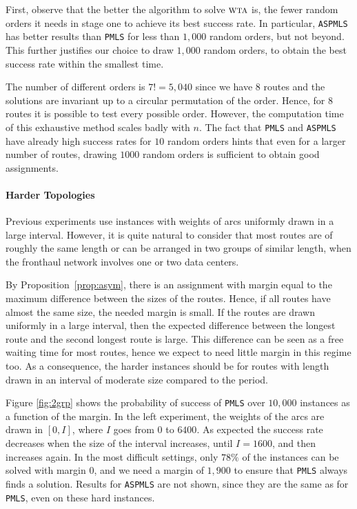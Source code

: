 \documentclass[a4paper,10pt]{journal}
\newcommand\PMLS{\texttt{PMLS}\xspace}
\newcommand\ASPMLS{\texttt{ASPMLS}\xspace}
\newcommand\wta{\textsc{wta}\xspace}
\begin{document}
	First, observe that the better the algorithm to solve $\wta$ is, the fewer random orders it needs in stage one to achieve its best success rate. In particular, \ASPMLS has better results than \PMLS for less than $1,000$ random orders, but not beyond. This further justifies our choice to draw $1,000$ random orders, to obtain the best success rate within the smallest time.

	The number of different orders is $7!= 5,040$ since we have $8$ routes and the solutions are invariant up to a circular permutation of the order. Hence, for $8$ routes it is possible to test every possible order. However, the computation time of this exhaustive method scales badly with $n$. The fact that \PMLS and \ASPMLS have already high success rates for $10$ random orders hints that even for a larger number of routes, drawing $1000$ random orders is sufficient to obtain good assignments.


     \paragraph{Harder Topologies}
     
    Previous experiments use instances with weights of arcs uniformly drawn in a large interval. However, it is quite natural to consider that most routes are of roughly the same length or can be arranged in two groups of similar length, when the fronthaul network involves one or two data centers.
    
		  By Proposition~\ref{prop:asym}, there is an assignment with margin equal to the maximum difference
    between the sizes of the routes. Hence, if all routes have almost the same size, the needed margin is small. If the routes are drawn uniformly in a large interval, then the expected difference between the longest route and the second longest route is large. This difference can be seen as a free waiting time for most routes, hence we expect to need little margin in this regime too. As a consequence, the harder instances should be for routes with length drawn in an interval of moderate size compared to the period.

  	Figure \ref{fig:2grp} shows the probability of success of \PMLS  over $10,000$ instances as a function of the margin. In the left experiment, the weights of the arcs are drawn in $[0,I]$, where $I$ goes from $0$ to $6400$. As expected the success rate decreases when the size of the interval increases, until $I = 1600$, and then increases again.  In the most difficult settings, only $78\%$ of the instances can be solved with margin $0$, and we need a margin of $1,900$ to ensure that \PMLS always finds a solution. Results for \ASPMLS are not shown, since they are the same as for \PMLS, even on these hard instances.
\end{document}
